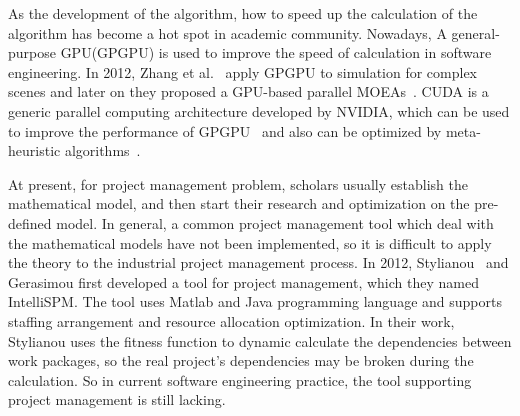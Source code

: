 As the development of the algorithm, how to speed up the calculation of the algorithm
has become a hot spot in academic community. Nowadays,  A general-purpose GPU(GPGPU) is used 
to improve the speed of calculation in software engineering. In 2012, Zhang et al.~\cite{zhang} apply GPGPU to
simulation for complex scenes and later on they proposed a GPU-based parallel MOEAs~\cite{li}.
CUDA is a generic parallel computing architecture developed by NVIDIA, which can be used to improve the performance of GPGPU~\cite{langdon2} and also can be optimized by meta-heuristic algorithms~\cite{langdon1}.


At present, for project management problem, scholars usually establish the
mathematical model, and then start their research and optimization on the
pre-defined model. In general, a common project management tool which deal with
the mathematical models have not been implemented, so it is difficult to apply
the theory to the industrial project management process. In 2012, Stylianou~\cite{stylianou} and
Gerasimou first developed a tool for project management, which they named
IntelliSPM. The tool uses Matlab and Java programming language and 
supports staffing arrangement and resource allocation optimization. In
their work, Stylianou uses the fitness function to dynamic calculate the
dependencies between work packages, so the real project's dependencies may be
broken during the calculation. So in current software engineering practice, the
tool supporting project management is still lacking.

